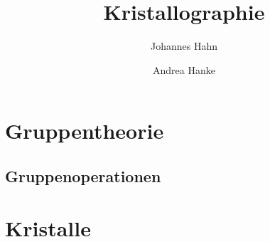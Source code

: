 \documentclass[fontsize=11pt,fleqn,a4paper]{scrartcl}
\title{Kristallographie}
\author{Johannes Hahn \and Andrea Hanke}
\begin{document}
\maketitle

\section{Gruppentheorie}

\subsection{Gruppenoperationen}


\pagebreak
\section{Kristalle}

\end{document}
